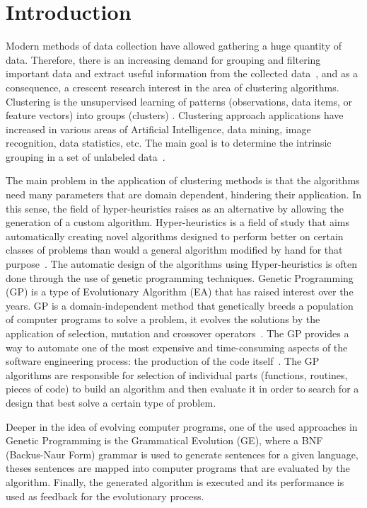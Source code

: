 \documentclass[conference,compsoc]{IEEEtran}
\begin{document}
\section{Introduction}

Modern methods of data collection have allowed gathering a huge quantity of data. Therefore, there is an increasing demand for grouping and filtering important data and extract useful information from the collected data~\cite{ahalya2015data}, and as a consequence, a crescent research interest in the area of clustering algorithms. Clustering is the unsupervised learning of patterns (observations, data items, or feature vectors) into groups (clusters) \cite{jain1988algorithms}. Clustering approach applications have increased in various areas of Artificial Intelligence, data mining, image recognition, data statistics, etc. The main goal is to determine the intrinsic grouping in a set of unlabeled data~\cite{ahalya2015data}.

The main problem in the application of clustering methods is that the algorithms need many parameters that are domain dependent, hindering their application. In this sense, the field of hyper-heuristics raises as an alternative by allowing the generation of a custom algorithm. Hyper-heuristics is a field of study that aims automatically creating novel algorithms designed to perform better on certain classes of problems than would a general algorithm modified by hand for that purpose~\cite{harris2015comparison}. The automatic design of the algorithms using Hyper-heuristics is  often done through the use of genetic programming techniques. Genetic Programming (GP) is a type of Evolutionary Algorithm (EA) that has raised interest over the years. GP is a domain-independent method that genetically breeds a population of computer programs to solve a problem, it evolves the solutions by the application of selection, mutation and crossover operators~\cite{poli2014genetic}. The GP provides a way to automate one of the most expensive and time-consuming aspects of the software engineering process: the production of the code itself~\cite{langdon2013optimising}. The GP algorithms are responsible for selection of individual parts (functions, routines, pieces of code) to build an algorithm and then evaluate it in order to search for a design that best solve a certain type of problem.

Deeper in the idea of evolving computer programs, one of the used approaches in Genetic Programming is the Grammatical Evolution (GE), where a BNF (Backus-Naur Form) grammar is used to generate sentences for a given language, theses sentences are mapped into  computer programs that are evaluated by the algorithm. Finally, the generated algorithm is executed and its performance is used as feedback for the evolutionary process.
\end{document}
